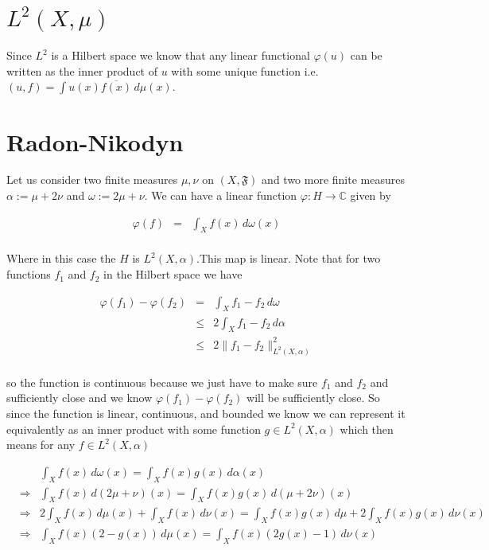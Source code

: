 \documentclass[oneside]{book}
\begin{document}
\section{$L^2(X,\mu)$}
Since $L^2$ is a Hilbert space we know that any linear functional $\varphi(u)$ can be written as the inner product of $u$ with some unique function i.e. $(u,f) = \int u(x) \overline{f(x)}\, d\mu(x)$.

\section{Radon-Nikodyn}
Let us consider two finite measures $\mu,\nu$ on $(X,\mathfrak{F})$ and two more finite measures $\alpha := \mu + 2\nu$ and $\omega := 2\mu + \nu$. We can have a linear function $\varphi: H \to \mathbb{C}$ given by

\begin{eqnarray}
\varphi(f) &=& \int_X f(x)\, d\omega(x)\nonumber\\
\end{eqnarray}

Where in this case the $H$ is $L^2(X,\alpha)$.This map is linear. Note that for two functions $f_1$ and $f_2$ in the Hilbert space we have

\begin{eqnarray}
\varphi(f_1) - \varphi(f_2) &=& \int_X f_1-f_2\, d\omega\nonumber\\
&\le& 2 \int_X f_1-f_2\, d\alpha \nonumber\\
&\le& 2 \| f_1 - f_2 \|_{L^2(X,\alpha)}^2 \nonumber\\
\end{eqnarray}

so the function is continuous because we just have to make sure $f_1$ and $f_2$ and sufficiently close and we know $\varphi(f_1) - \varphi(f_2)$ will be sufficiently close. So since the function is linear, continuous, and bounded we know we can represent it equivalently as an inner product with some function $g \in L^2(X,\alpha)$ which then means for any $f \in L^2(X,\alpha)$

\begin{eqnarray}
&&\int_X f(x)\, d\omega(x) = \int_X f(x) g(x)\, d\alpha(x)\nonumber \nonumber\\
&\Rightarrow& \int_X f(x)\, d(2\mu+\nu)(x) = \int_X f(x) g(x)\, d(\mu+2\nu)(x)\nonumber \\
&\Rightarrow& 2\int_X f(x)\, d\mu(x) + \int_X f(x)\, d\nu(x) = \int_X f(x) g(x)\, d\mu+ 2 \int_X f(x) g(x)\, d\nu(x)\nonumber \\
&\Rightarrow& \int_X f(x) (2-g(x))\, d\mu(x) = \int_X f(x) (2g(x)-1)\, d\nu(x)
\end{eqnarray}
\end{document}
